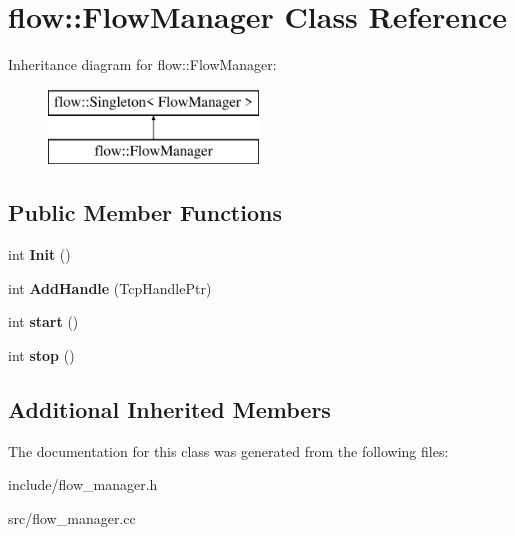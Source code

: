 \hypertarget{classflow_1_1_flow_manager}{}\section{flow\+:\+:Flow\+Manager Class Reference}
\label{classflow_1_1_flow_manager}
Inheritance diagram for flow\+:\+:Flow\+Manager\+:\begin{figure}[H]
\begin{center}
\leavevmode
\includegraphics[height=2.000000cm]{classflow_1_1_flow_manager}
\end{center}
\end{figure}
\subsection*{Public Member Functions}
\begin{DoxyCompactItemize}
\item 
int {\bfseries Init} ()\hypertarget{classflow_1_1_flow_manager_a784b457006c6bc1f0ad09d2944ca4498}{}\label{classflow_1_1_flow_manager_a784b457006c6bc1f0ad09d2944ca4498}

\item 
int {\bfseries Add\+Handle} (Tcp\+Handle\+Ptr)\hypertarget{classflow_1_1_flow_manager_aa255658b3e59916de9c1cf7f7d879b07}{}\label{classflow_1_1_flow_manager_aa255658b3e59916de9c1cf7f7d879b07}

\item 
int {\bfseries start} ()\hypertarget{classflow_1_1_flow_manager_a7a45fa764a5e06cbfeaad0abe5b08879}{}\label{classflow_1_1_flow_manager_a7a45fa764a5e06cbfeaad0abe5b08879}

\item 
int {\bfseries stop} ()\hypertarget{classflow_1_1_flow_manager_ace188312cb4a79b9931ba4dcc057de18}{}\label{classflow_1_1_flow_manager_ace188312cb4a79b9931ba4dcc057de18}

\end{DoxyCompactItemize}
\subsection*{Additional Inherited Members}


The documentation for this class was generated from the following files\+:\begin{DoxyCompactItemize}
\item 
include/flow\+\_\+manager.\+h\item 
src/flow\+\_\+manager.\+cc\end{DoxyCompactItemize}
